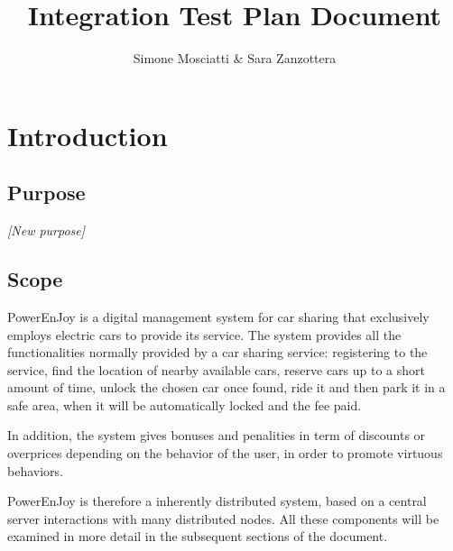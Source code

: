 \documentclass[11pt]{article} %
\title{Integration	Test Plan Document}
\author{Simone Mosciatti \& Sara Zanzottera}
\newcommand{\pe}{PowerEnJoy }
\begin{document}
\maketitle
\newpage
\tableofcontents
\newpage


\section{Introduction}

\subsection{Purpose}

\textit{[New purpose]}

\subsection{Scope}

\pe is a digital management system for car sharing that exclusively employs electric cars to provide its service. The system provides all the functionalities normally provided by a car sharing service: registering to the service, find the location of nearby available cars, reserve cars up to a short amount of time, unlock the chosen car once found, ride it and then park it in a safe area, when it will be automatically locked and the fee paid.

In addition, the system gives bonuses and penalities in term of discounts or overprices depending on the behavior of the user, in order to promote virtuous behaviors.

\pe is therefore a inherently distributed system, based on a central server interactions with many distributed nodes. All these components will be examined in more detail in the subsequent sections of the document.
\end{document}
